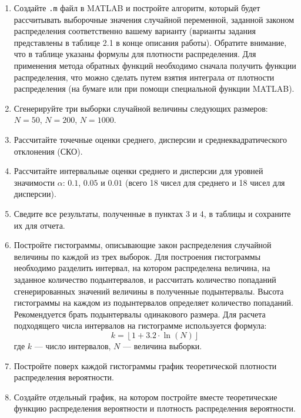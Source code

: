 \begin{enumerate}
    \item Создайте \texttt{.m} файл в MATLAB и постройте алгоритм, который будет рассчитывать выборочные значения случайной переменной, заданной законом распределения соответственно вашему варианту (варианты задания представлены в таблице 2.1 в конце описания работы). Обратите внимание, что в таблице указаны формулы для плотности распределения. Для применения метода обратных функций необходимо сначала получить функции распределения, что можно сделать путем взятия интеграла от плотности распределения (на бумаге или при помощи специальной функции MATLAB).
    
    \item Сгенерируйте три выборки случайной величины следующих размеров: $N = 50$, $N = 200$, $N = 1000$.
    
    \item Рассчитайте точечные оценки среднего, дисперсии и среднеквадратического отклонения (СКО).
    
    \item Рассчитайте интервальные оценки среднего и дисперсии для уровней значимости $\alpha$: $0.1$, $0.05$ и $0.01$ (всего 18 чисел для среднего и 18 чисел для дисперсии).
    
    \item Сведите все результаты, полученные в пунктах 3 и 4, в таблицы и сохраните их для отчета.
    
    \item Постройте гистограммы, описывающие закон распределения случайной величины по каждой из трех выборок. Для построения гистограммы необходимо разделить интервал, на котором распределена величина, на заданное количество подынтервалов, и рассчитать количество попаданий сгенерированных значений величины в полученные подынтервалы. Высота гистограммы на каждом из подынтервалов определяет количество попаданий. Рекомендуется брать подынтервалы одинакового размера. Для расчета подходящего числа интервалов на гистограмме используется формула:
    \[
    k = \left\lfloor 1 + 3.2 \cdot \ln(N) \right\rfloor
    \]
    где $k$ — число интервалов, $N$ — величина выборки.
    
    \item Постройте поверх каждой гистограммы график теоретической плотности распределения вероятности.
    
    \item Создайте отдельный график, на котором постройте вместе теоретические функцию распределения вероятности и плотность распределения вероятности.
    

\end{enumerate}
